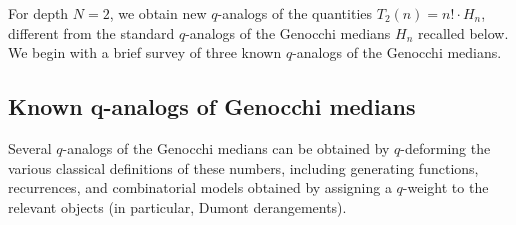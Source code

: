 \documentclass[pdftex]{sigma}
\numberwithin{equation}{section}
\theoremstyle{definition}
\begin{document}
For depth $N=2$, we obtain new $q$-analogs of the quantities
$T_2(n)=n!\cdot H_n$, different from the standard $q$-analogs of the Genocchi
medians $H_n$ recalled below.
We begin with a brief survey of three known $q$-analogs of the Genocchi medians.

\subsection[Known q-analogs of Genocchi medians]{Known $\boldsymbol{q}$-analogs of Genocchi medians}
\label{subsec:known_q_analogs}

Several $q$-analogs of the Genocchi medians can be obtained by $q$-deforming the
various classical definitions of these numbers, including generating functions,
recurrences, and combinatorial models obtained by assigning a $q$-weight to the
relevant objects (in particular, Dumont derangements).
\end{document}
